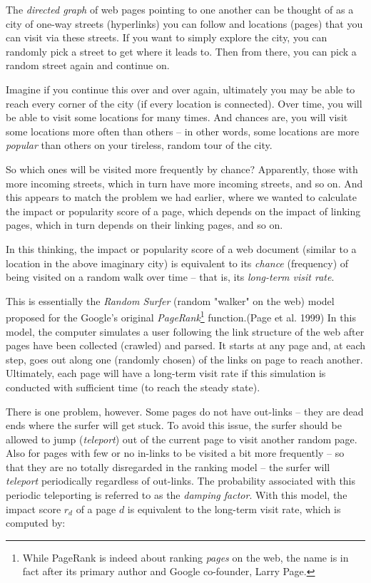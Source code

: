 \documentclass[
  letterpaper,
]{scrbook}
\begin{document}
The \emph{directed graph} of web pages pointing to one another can be
thought of as a city of one-way streets (hyperlinks) you can follow and
locations (pages) that you can visit via these streets. If you want to
simply explore the city, you can randomly pick a street to get where it
leads to. Then from there, you can pick a random street again and
continue on.

Imagine if you continue this over and over again, ultimately you may be
able to reach every corner of the city (if every location is connected).
Over time, you will be able to visit some locations for many times. And
chances are, you will visit some locations more often than others -- in
other words, some locations are more \emph{popular} than others on your
tireless, random tour of the city.

So which ones will be visited more frequently by chance? Apparently,
those with more incoming streets, which in turn have more incoming
streets, and so on. And this appears to match the problem we had
earlier, where we wanted to calculate the impact or popularity score of
a page, which depends on the impact of linking pages, which in turn
depends on their linking pages, and so on.

In this thinking, the impact or popularity score of a web document
(similar to a location in the above imaginary city) is equivalent to its
\emph{chance} (frequency) of being visited on a random walk over time --
that is, its \emph{long-term visit rate}.

This is essentially the \emph{Random Surfer} (random "walker" on the
web) model proposed for the Google's original \emph{PageRank}\footnote{While
  PageRank is indeed about ranking \emph{pages} on the web, the name is
  in fact after its primary author and Google co-founder, Larry Page.}
function.(Page et al. 1999) In this model, the computer simulates a user
following the link structure of the web after pages have been collected
(crawled) and parsed. It starts at any page and, at each step, goes out
along one (randomly chosen) of the links on page to reach another.
Ultimately, each page will have a long-term visit rate if this
simulation is conducted with sufficient time (to reach the steady
state).

There is one problem, however. Some pages do not have out-links -- they
are dead ends where the surfer will get stuck. To avoid this issue, the
surfer should be allowed to jump (\emph{teleport}) out of the current
page to visit another random page. Also for pages with few or no
in-links to be visited a bit more frequently -- so that they are no
totally disregarded in the ranking model -- the surfer will
\emph{teleport} periodically regardless of out-links. The probability
associated with this periodic teleporting is referred to as the
\emph{damping factor}. With this model, the impact score \(r_d\) of a
page \(d\) is equivalent to the long-term visit rate, which is computed
by:
\end{document}
